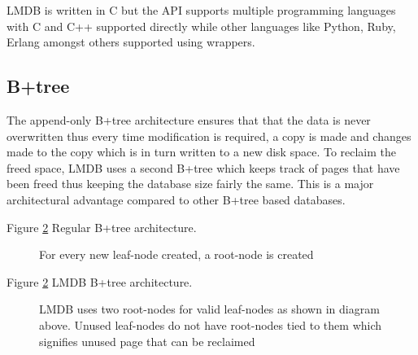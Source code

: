 \documentclass[9pt,twocolumn,twoside]{styles/osajnl}
\begin{document}
LMDB is written in C but the API supports multiple programming
languages with C and C++ supported directly while other languages like
Python, Ruby, Erlang amongst others supported using
wrappers\cite{www-lmdbwrap}.

\subsection{B+tree}

The append-only B+tree architecture ensures that that the data is
never overwritten thus every time modification is required, a copy is
made and changes made to the copy which is in turn written to a new
disk space. To reclaim the freed space, LMDB uses a second B+tree
which keeps track of pages that have been freed thus keeping the
database size fairly the same. This is a major architectural advantage
compared to other B+tree based databases.

Figure \ref{fig:false-color} Regular B+tree architecture.

\begin{figure}[htbp]
\centering
{}
\caption{For every new leaf-node created, a root-node is created}
\label{fig:false-color}
\end{figure}

Figure \ref{fig:false-color} LMDB B+tree architecture.

\begin{figure}[htbp]
\centering
{}
\caption{LMDB uses two root-nodes for valid leaf-nodes as shown in
  diagram above. Unused leaf-nodes do not have root-nodes tied to them
  which signifies unused page that can be reclaimed}
\label{fig:false-color}
\end{figure}
\end{document}
